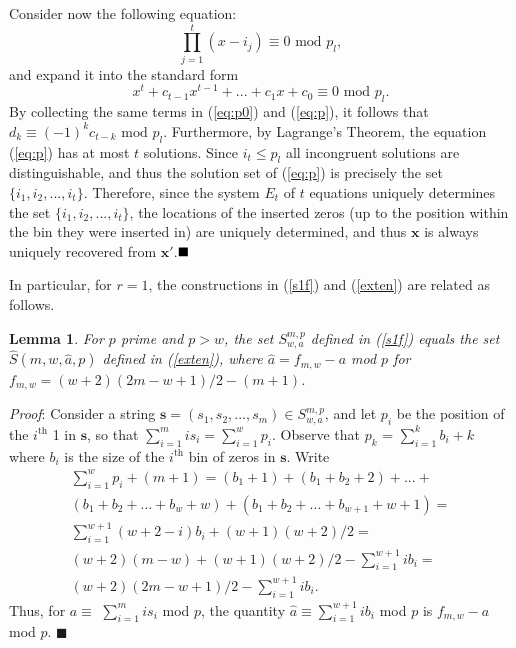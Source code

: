 \documentclass[12pt]{article} \pagestyle{plain} \topmargin
\newtheorem{lemma}{Lemma}
\begin{document}
{Consider now the following equation:
\begin{equation}\label{eq:p0} \prod_{j=1}^t(x-i_j)\equiv 0 \text{ mod } p_l,
\end{equation}
and expand it into the standard form
\begin{equation}\label{eq:p}
x^t+c_{t-1}x^{t-1}+...+c_1x+c_0 \equiv 0 \text{ mod } p_l.
\end{equation}
By collecting the same terms in (\ref{eq:p0}) and (\ref{eq:p}), it
follows that $d_k \equiv (-1)^kc_{t-k} \text{ mod } p_l$.
Furthermore, by Lagrange's Theorem, the equation (\ref{eq:p}) has
at most $t$ solutions. Since $i_t \leq p_l$ all incongruent
solutions are distinguishable, and thus the solution set of
(\ref{eq:p}) is precisely the set $\{i_1,i_2,...,i_t\}$.
Therefore, since the system $E_t$ of $t$ equations uniquely
determines the set $\{i_1,i_2,...,i_t\}$, the locations of the
inserted zeros (up to the position within the bin they were
inserted in) are uniquely determined, and thus $\mathbf{x}$ is
always uniquely recovered from $\mathbf{x'}$.$\hfill\blacksquare$
}

In particular, for $r=1$, the constructions in (\ref{s1f}) and
(\ref{exten}) are related as follows.

\begin{lemma}\textit{For $p$ prime and $p > w$, the set $S_{w,a}^{m,p}$
defined in (\ref{s1f}) equals the set $\hat{S}(m,w,\hat{a},p)$
defined in (\ref{exten}), where $\hat{a}=f_{m,w}-{a}$ mod $p$ for
$f_{m,w}=(w+2)(2m-w+1)/2-(m+1)$.}\end{lemma} \textit{Proof}:
Consider a string $\mathbf{s} =(s_1,s_2,...,s_m)\in S_{w,a}^{m,p}$,
and let $p_i$ be the position of the $i^{\text{th}}$ 1 in
$\mathbf{s}$, so that $\sum_{i=1}^m is_i =\sum_{i=1}^w p_i$. Observe
that $p_k$ = $\sum_{i=1}^k b_i+k$ where $b_i$ is the size of the
$i^{\text{th}}$ bin of zeros in $\mathbf{s}$. Write
\begin{equation}\begin{array}{lll}
\sum_{i=1}^wp_i+(m+1)=
(b_1+1)+(b_1+b_2+2)+...+\\
(b_1+b_2+...+b_w+w)+(b_1+b_2+...+b_{w+1}+w+1)=\\
\sum_{i=1}^{w+1}(w+2-i)b_i+(w+1)(w+2)/2=\\
(w+2)(m-w)+(w+1)(w+2)/2-\sum_{i=1}^{w+1}ib_i=\\
(w+2)(2m-w+1)/2-\sum_{i=1}^{w+1}ib_i.
\end{array}\end{equation}
Thus, for $a \equiv$ $\sum_{i=1}^m is_i$ mod $p$, the quantity
$\hat{a} \equiv \sum_{i=1}^{w+1}ib_i$ mod $p$ is $ f_{m,w}-a$ mod
$p$. \hfill$\blacksquare$
\end{document}
